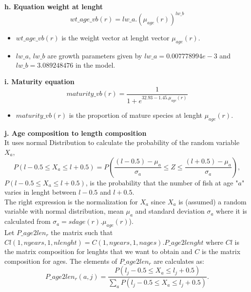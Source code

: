 \documentclass{article}
\begin{document}
\hfill

\textbf{h. Equation weight at lenght}\\
\begin{equation}
     wt\_age\_vb(r) = lw\_a . \left(\mu_{age}(r)\right)^{lw\_b}
 \end{equation}
 \begin{itemize}
     \item $wt\_age\_vb(r)$ is the weight vector at lenght vector $\mu_{age}(r)$.
     \item $lw\_a$, $lw\_b$ are growth parameters given by  $lw\_a=0.007778994e-3$ and $lw\_b=3.089248476$ in the model.
 \end{itemize}

\hfill

\textbf{i. Maturity equation}\\
 \begin{equation}
    maturity\_vb(r) = \dfrac{1}{1+e^{32.93-1.45.\mu_{age}(r)}}
\end{equation}
\begin{itemize}
    \item $maturity\_vb(r)$ is the proportion of mature species at lenght $\mu_{age}(r)$.
\end{itemize}

\hfill

\textbf{j. Age composition to length composition}\\

It uses normal Distribution to calculate the probability of the random variable $X_a$, 
\begin{equation}
    P(l-0.5\leq X_a\leq l+0.5 ) = P\left(\dfrac{(l-0.5)-\mu_a}{\sigma_a}\leq Z\leq\dfrac{(l+0.5)-\mu_a}{\sigma_a}\right),
\end{equation}
$P(l-0.5\leq X_a\leq l+0.5 )$, is the probability that the number of fish at age "$a$" varies in lenght between  $l-0.5$ and $l+0.5$. \\
The right expression is the normalization for $X_a$ since $X_a$ is (assumed) a random variable with normal distribution, mean $\mu_a$ and  standard deviation $\sigma_a$ where it is calculated from $\sigma_{a}=sdage(r).\mu_{age}(r)$).\\

Let $P\_age2len_r$ the matrix such that $Cl(1,nyears,1,nlenght)=C(1,nyears,1,nages).P\_age2lenght$ where $Cl$ is the matrix composition for lenghts that we want to obtain and $C$ is the matrix composition for ages. The elements of $P\_age2len_r$ are calculates as:
\begin{equation}
    P\_age2len_r(a,j) = \dfrac{P(l_j-0.5\leq X_a\leq l_j+0.5 )}{\sum_{a}P(l_j-0.5\leq X_a\leq l_j+0.5 )}.
\end{equation}
\end{document}
